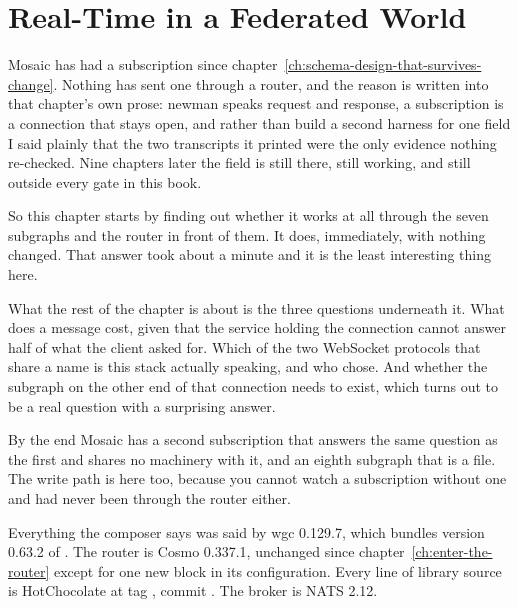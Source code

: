\chapter{Real-Time in a Federated World}
\label{ch:real-time-in-a-federated-world}

Mosaic has had a subscription since
chapter~\ref{ch:schema-design-that-survives-change}. Nothing has sent one
through a router, and the reason is written into that chapter's own prose:
newman speaks request and response, a subscription is a connection that stays
open, and rather than build a second harness for one field I said plainly that
the two transcripts it printed were the only evidence nothing re-checked. Nine
chapters later the field is still there, still working, and still outside every
gate in this book.

So this chapter starts by finding out whether it works at all through the seven
subgraphs and the router in front of them. It does, immediately, with nothing
changed. That answer took about a minute and it is the least interesting thing
here.

What the rest of the chapter is about is the three questions underneath it.
What does a message cost, given that the service holding the connection cannot
answer half of what the client asked for. Which of the two WebSocket protocols
that share a name is this stack actually speaking, and who chose. And whether
the subgraph on the other end of that connection needs to exist, which turns
out to be a real question with a surprising answer.

By the end Mosaic has a second subscription that answers the same question as
the first and shares no machinery with it, and an eighth subgraph that is a
file. The write path is here too, because you cannot watch a subscription
without one and  had never been through the router either.

Everything the composer says was said by wgc 0.129.7, which bundles version
0.63.2 of . The router is Cosmo 0.337.1,
unchanged since chapter~\ref{ch:enter-the-router} except for one new block in
its configuration. Every line of library source is HotChocolate at tag
, commit . The broker is NATS 2.12.








